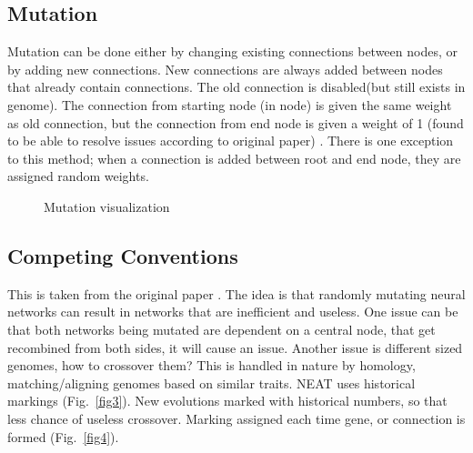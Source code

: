 \documentclass[conference]{IEEEtran}
\begin{document}
\subsection{Mutation}

Mutation can be done either by changing existing connections between nodes, or by adding new connections. New connections are always added between nodes that already contain connections. The old connection is disabled(but still exists in genome). The connection from starting node (in node) is given the same weight as old connection, but the connection from end node is given a weight of 1 (found to be able to resolve issues according to original paper) \cite{b2}. There is one exception to this method; when a connection is added between root and end node, they are assigned random weights. 

\begin{figure}[htbp]
\caption{Mutation visualization}
\label{fig2}
\end{figure}

\subsection{Competing Conventions}

This is taken from the original paper \cite{b2}. The idea is that randomly mutating neural networks can result in networks that are inefficient and useless. One issue can be that both networks being mutated are dependent on a central node, that get recombined from both sides, it will cause an issue. Another issue is different sized genomes, how to crossover them? This is handled in nature by homology, matching/aligning genomes based on similar traits. NEAT uses historical markings (Fig.~\ref{fig3}). New evolutions marked with historical numbers, so that less chance of useless crossover. Marking assigned each time gene, or connection is formed (Fig.~\ref{fig4}). 
\end{document}
